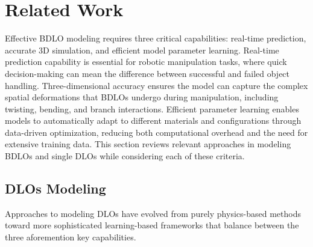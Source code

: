\section{Related Work}


Effective BDLO modeling requires three critical capabilities: real-time prediction, accurate 3D simulation, and efficient model parameter learning.
Real-time prediction capability is essential for robotic manipulation tasks, where quick decision-making can mean the difference between successful and failed object handling.
Three-dimensional accuracy ensures the model can capture the complex spatial deformations that BDLOs undergo during manipulation, including twisting, bending, and branch interactions.
Efficient parameter learning enables models to automatically adapt to different materials and configurations through data-driven optimization, reducing both computational overhead and the need for extensive training data.
This section reviews relevant approaches in modeling BDLOs and single DLOs while considering each of these criteria.

\subsection{DLOs Modeling}
Approaches to modeling DLOs have evolved from purely physics-based methods toward more sophisticated learning-based frameworks that balance between the three aforemention key capabilities. 


